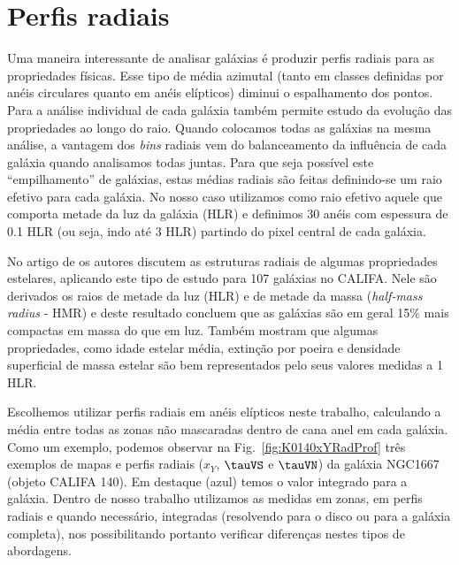 \section{Perfis radiais}
\label{sec:amostra:rad}

Uma maneira interessante de analisar galáxias é produzir perfis radiais para as propriedades
físicas. Esse tipo de média azimutal (tanto em classes definidas por anéis circulares quanto em
anéis elípticos) diminui o espalhamento dos pontos. Para a análise individual de cada galáxia também
permite estudo da evolução das propriedades ao longo do raio. Quando colocamos todas as galáxias na
mesma análise, a vantagem dos {\em bins} radiais vem do balanceamento da influência de cada galáxia
quando analisamos todas juntas. Para que seja possível este ``empilhamento'' de galáxias, estas
médias radiais são feitas definindo-se um raio efetivo para cada galáxia. No nosso caso utilizamos
como raio efetivo aquele que comporta metade da luz da galáxia (HLR) e definimos 30 anéis com
espessura de 0.1 HLR (ou seja, indo até 3 HLR) partindo do pixel central de cada galáxia.

No artigo de \citet{GonzalezDelgado.etal.2014a} os autores discutem as estruturas radiais de algumas
propriedades estelares, aplicando este tipo de estudo para 107 galáxias no CALIFA. Nele são
derivados os raios de metade da luz (HLR) e de metade da massa ({\em half-mass radius} - HMR) e
deste resultado concluem que as galáxias são em geral 15\% mais compactas em massa do que em luz.
Também mostram que algumas propriedades, como idade estelar média, extinção por poeira e densidade
superficial de massa estelar são bem representados pelo seus valores medidas a 1 HLR.

Escolhemos utilizar perfis radiais em anéis elípticos neste trabalho, calculando a média entre todas
as zonas não mascaradas dentro de cana anel em cada galáxia. Como um exemplo, podemos observar na
Fig.\ \ref{fig:K0140xYRadProf} três exemplos de mapas e perfis radiais ($x_Y$, $\tauVS$ e $\tauVN$)
da galáxia NGC1667 (objeto CALIFA 140). Em destaque (azul) temos o valor integrado para a galáxia.
Dentro de nosso trabalho utilizamos as medidas em zonas, em perfis radiais e quando necessário,
integradas (resolvendo para o disco ou para a galáxia completa), nos possibilitando portanto
verificar diferenças nestes tipos de abordagens.

